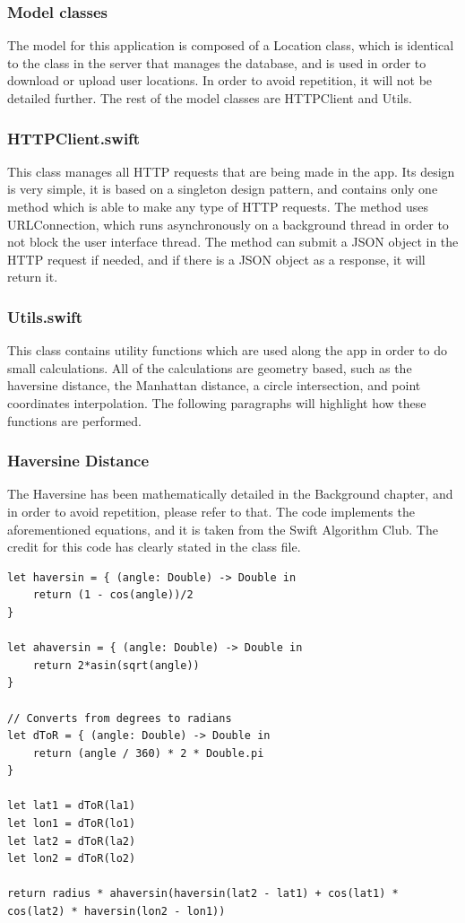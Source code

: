\subsubsection{Model classes}
The model for this application is composed of a Location class, which is identical to the class in the server that manages the database, and is used in order to download or upload user locations. In order to avoid repetition, it will not be detailed further. The rest of the model classes are HTTPClient and Utils.

\subsubsection*{HTTPClient.swift}
This class manages all HTTP requests that are being made in the app. Its design is very simple, it is based on a singleton design pattern, and contains only one method which is able to make any type of HTTP requests. The method uses URLConnection, which runs asynchronously on a background thread in order to not block the user interface thread. The method can submit a JSON object in the HTTP request if needed, and if there is a JSON object as a response, it will return it.

\subsubsection*{Utils.swift}
This class contains utility functions which are used along the app in order to do small calculations. All of the calculations are geometry based, such as the haversine distance, the Manhattan distance, a circle intersection, and point coordinates interpolation. The following paragraphs will highlight how these functions are performed.

\subsubsection*{Haversine Distance}
The Haversine has been mathematically detailed in the Background chapter, and in order to avoid repetition, please refer to that. The code implements the aforementioned equations, and it is taken from the Swift Algorithm Club. The credit for this code has clearly stated in the class file.

\begin{lstlisting}
let haversin = { (angle: Double) -> Double in
	return (1 - cos(angle))/2
}
		
let ahaversin = { (angle: Double) -> Double in
    return 2*asin(sqrt(angle))
}
		
// Converts from degrees to radians
let dToR = { (angle: Double) -> Double in
    return (angle / 360) * 2 * Double.pi
}
		
let lat1 = dToR(la1)
let lon1 = dToR(lo1)
let lat2 = dToR(la2)
let lon2 = dToR(lo2)
		
return radius * ahaversin(haversin(lat2 - lat1) + cos(lat1) * cos(lat2) * haversin(lon2 - lon1))
\end{lstlisting}


